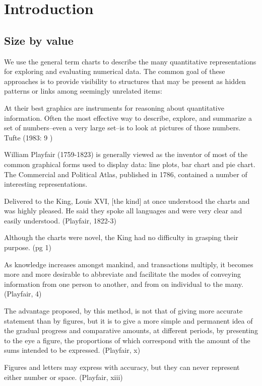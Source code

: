 \section{Introduction}\label{charts-intro}

\subsection{Size by value}\label{size-by-value}

We use the general term charts to describe the many quantitative representations for exploring and evaluating numerical data.  The common goal of these approaches is to provide visibility to structures that may be present as hidden patterns or links among seemingly unrelated items:

At their best graphics are instruments for reasoning about quantitative information. Often the most effective way to describe, explore, and summarize a set of numbers--even a very large set--is to look at pictures of those numbers. Tufte (1983: 9 )

William Playfair (1759-1823) is generally viewed as the inventor of most of the common graphical forms used to display data: line plots, bar chart and pie chart. The Commercial and Political Atlas, published in 1786, contained a number of interesting representations.

Delivered to the King, Louis XVI,
[the kind] at once understood the charts and was highly pleased. He said they spoke all languages and were very clear and easily understood. (Playfair, 1822-3)

Although the charts were novel, the King had no difficulty in grasping their purpose. (pg 1)

As knowledge increases amongst mankind, and transactions multiply, it becomes more and more desirable to abbreviate and facilitate the modes of conveying information from one person to another, and from on individual to the many. (Playfair, 4)

The advantage proposed, by this method, is not that of giving more accurate statement than by figures, but it is to give a more simple and permanent idea of the gradual progress and comparative amounts, at different periods, by presenting to the eye a figure, the proportions of which correspond with the amount of the sums intended to be expressed. (Playfair, x)

Figures and letters may express with accuracy, but they can never represent either number or space. (Playfair, xiii)

